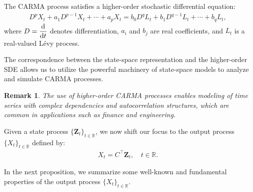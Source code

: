 \documentclass[10pt,a4paper,reqno]{amsart}
\newtheorem{remark}[theorem]{Remark}
\theoremstyle{example}
\newcommand*\D{\mathop{}\!\textnormal{d}}
\begin{document}
The CARMA process satisfies a higher-order stochastic differential equation:
\begin{align}\label{eq:CARMA-SDE}
D^{p} X_t + a_1 D^{p-1} X_t + \cdots + a_p X_t = b_0 D^{q} L_t + b_1 D^{q-1} L_t + \cdots + b_q L_t,
\end{align}
where $D = \dfrac{\D}{\D t}$ denotes differentiation, $a_i$ and $b_j$ are real coefficients, and $L_t$ is a real-valued L\'evy process.

The correspondence between the state-space representation and the higher-order SDE allows us to utilize the powerful machinery of state-space models to analyze and simulate CARMA processes.

\begin{remark}
The use of higher-order CARMA processes enables modeling of time series with complex dependencies and autocorrelation structures, which are common in applications such as finance and engineering.
\end{remark}

Given a state process $\{\mathbf{Z}_t\}_{t \in \mathbb{R}}$, we now shift our focus to the output process $\{X_t\}_{t \in \mathbb{R}}$ defined by:
\begin{align}\label{eq:output-process}
X_t = C^\top \mathbf{Z}_t, \quad t \in \mathbb{R}.
\end{align}

In the next proposition, we summarize some well-known and fundamental properties of the output process $\{X_t\}_{t \in \mathbb{R}}$.
\end{document}
